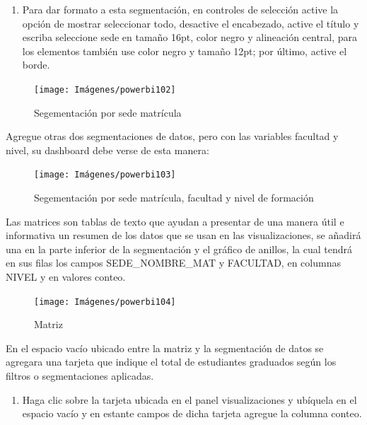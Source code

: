 \documentclass[
]{book}
\providecommand{\tightlist}{%
  \setlength{\itemsep}{0pt}\setlength{\parskip}{0pt}}
\begin{document}
\begin{enumerate}
\def\labelenumi{\arabic{enumi}.}
\setcounter{enumi}{3}
\tightlist
\item
  Para dar formato a esta segmentación, en controles de selección active la opción de mostrar seleccionar todo, desactive el encabezado, active el título y escriba seleccione sede en tamaño 16pt, color negro y alineación central, para los elementos también use color negro y tamaño 12pt; por último, active el borde.
\end{enumerate}

\begin{figure}

{\centering \texttt{[image: Imágenes/powerbi102]} 

}

\caption{Segementación por sede matrícula}\label{fig:paso4segmentacion-fig}
\end{figure}

Agregue otras dos segmentaciones de datos, pero con las variables facultad y nivel, su dashboard debe verse de esta manera:

\begin{figure}

{\centering \texttt{[image: Imágenes/powerbi103]} 

}

\caption{Segementación por sede matrícula, facultad y nivel de formación}\label{fig:segmentacionessedefacultadnivel-fig}
\end{figure}

Las matrices son tablas de texto que ayudan a presentar de una manera útil e informativa un resumen de los datos que se usan en las visualizaciones, se añadirá una en la parte inferior de la segmentación y el gráfico de anillos, la cual tendrá en sus filas los campos SEDE\_NOMBRE\_MAT y FACULTAD, en columnas NIVEL y en valores conteo.

\begin{figure}

{\centering \texttt{[image: Imágenes/powerbi104]} 

}

\caption{Matriz}\label{fig:matrizparanivel-fig}
\end{figure}

En el espacio vacío ubicado entre la matriz y la segmentación de datos se agregara una tarjeta que indique el total de estudiantes graduados según los filtros o segmentaciones aplicadas.

\begin{enumerate}
\def\labelenumi{\arabic{enumi}.}
\tightlist
\item
  Haga clic sobre la tarjeta ubicada en el panel visualizaciones y ubíquela en el espacio vacío y en estante campos de dicha tarjeta agregue la columna conteo.
\end{enumerate}
\end{document}
